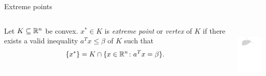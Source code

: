 \begin{frame}{Extreme points }



  
  
  \begin{columns}
    \begin{column}{.5\textwidth}
      \begin{definition}
  Let $K \subseteq \mathbb{R}^n$ be  convex. $x^* \in K$ is
 \emph{extreme point} or \emph{vertex} of $K$ if there exists a valid inequality $a^Tx \leq \beta$ of $K$ such that 
 \begin{displaymath}
   \{x^*\} = K \cap \{x \in \mathbb{R}^n \colon a^Tx = \beta\}.  
 \end{displaymath}
\end{definition}

    \end{column}
    \begin{column}{.5\textwidth}
      \centering
  \includegraphics[height=3cm]{../figures/ExtremePoint.pdf} 



    \end{column}       
  \end{columns}
\end{frame}




